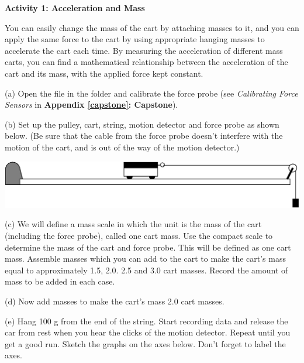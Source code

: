 \medskip
\textbf{Activity 1: Acceleration and Mass }

You can easily change the mass of the cart by attaching masses to it, and you
can apply the same force to the cart by using appropriate hanging masses to
accelerate the cart each time. By measuring the acceleration of different mass
carts, you can find a mathematical relationship between the acceleration of
the cart and its mass, with the applied force kept constant.

(a) Open the file   in the \filename{\coursefolder} folder and calibrate the force probe (see \textit{Calibrating Force Sensors} in \textbf{Appendix \ref{capstone}: Capstone}).
\medskip

(b) Set up the pulley, cart, string, motion detector and force probe as shown
below. (Be sure that the cable from the force probe doesn't interfere with the
motion of the cart, and is out of the way of the motion detector.)
\bigskip

\vspace{0.3cm}
{\par\centering \includegraphics{force1/force1_fig4.eps} \par}
\vspace{0.5cm}

(c) We will define a mass scale in which the unit is the mass of the cart (including the force probe), called one cart mass. Use the compact scale to determine the mass of the cart and force probe. This will be defined as one cart mass. Assemble masses which you can add to the cart to make the cart's mass equal to approximately 1.5, 2.0. 2.5 and 3.0 cart masses. Record the amount of mass to be added in each case.
\medskip

(d) Now add masses to make the cart's mass 2.0 cart masses.
\medskip

(e) Hang 100 g from the end of the string.
Start recording data and release the car from rest when you hear the clicks
of the motion detector. Repeat until you get a good run. Sketch the graphs on
the axes below. Don't forget to label the axes.

